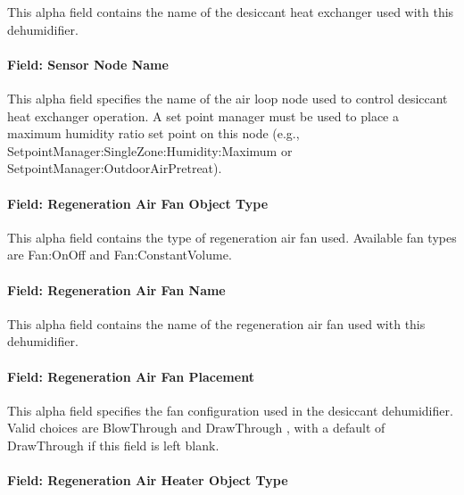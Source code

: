 This alpha field contains the name of the desiccant heat exchanger used with this dehumidifier.

\paragraph{Field: Sensor Node Name}\label{field-sensor-node-name-000}

This alpha field specifies the name of the air loop node used to control desiccant heat exchanger operation. A set point manager must be used to place a maximum humidity ratio set point on this node (e.g., SetpointManager:SingleZone:Humidity:Maximum or SetpointManager:OutdoorAirPretreat).

\paragraph{Field: Regeneration Air Fan Object Type}\label{field-regeneration-air-fan-object-type}

This alpha field contains the type of regeneration air fan used. Available fan types are Fan:OnOff and Fan:ConstantVolume.

\paragraph{Field: Regeneration Air Fan Name}\label{field-regeneration-air-fan-name}

This alpha field contains the name of the regeneration air fan used with this dehumidifier.

\paragraph{Field: Regeneration Air Fan Placement}\label{field-regeneration-air-fan-placement}

This alpha field specifies the fan configuration used in the desiccant dehumidifier. Valid choices are BlowThrough and DrawThrough , with a default of DrawThrough if this field is left blank.

\paragraph{Field: Regeneration Air Heater Object Type}\label{field-regeneration-air-heater-object-type}

